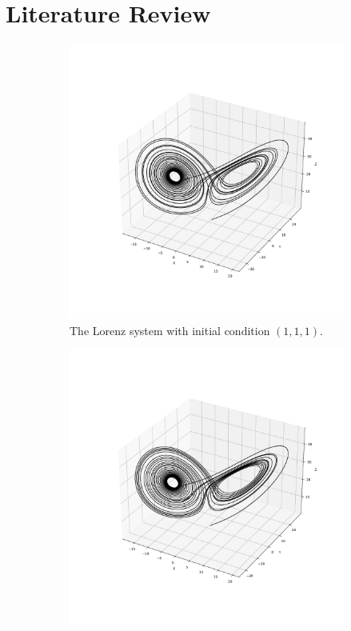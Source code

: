 \documentclass[11pt]{article}
\theoremstyle{definition}
\begin{document}
\section{Literature Review}
\label{sec: literaturereview}

\begin{figure}
\centering
\begin{subfigure}{0.45\textwidth}
  \centering
  \includegraphics[trim=2cm 2cm 2cm 2cm, clip, scale=0.3]{Lorenz1.pdf}
  \caption{The Lorenz system with initial condition $(1,1,1)$.}
  \label{subfig1:mp}
\end{subfigure}\hfill
\begin{subfigure}{0.45\textwidth}
  \centering
  \includegraphics[trim=2cm 2cm 2cm 2cm, clip, scale=0.3]{Lorenz2.pdf}

\end{subfigure}
\end{figure}
\end{document}
